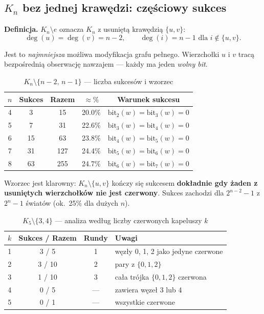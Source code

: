 \documentclass[12pt,a4paper]{article}
\theoremstyle{plain}
\theoremstyle{definition}
\theoremstyle{remark}
\begin{document}
\subsection{$K_n$ bez jednej krawędzi: częściowy sukces}
\label{sec:kne}

\textbf{Definicja.} $K_n \setminus e$ oznacza $K_n$ z usuniętą krawędzią $\{u, v\}$:
$$\deg(u) = \deg(v) = n-2, \qquad \deg(i) = n-1 \text{ dla } i \notin \{u, v\}.$$

Jest to \emph{najmniejsza} możliwa modyfikacja grafu pełnego. Wierzchołki $u$ i $v$ tracą bezpośrednią obserwację nawzajem — każdy ma jeden \emph{wolny bit}.

\begin{table}[H]
\centering
\caption{$K_n \setminus \{n{-}2,\, n{-}1\}$ — liczba sukcesów i wzorzec}
\begin{tabular}{ccccc}
\toprule
$n$ & Sukces & Razem & $\approx\%$ & Warunek sukcesu \\
\midrule
4 & 3  & 15  & 20.0\% & $\mathrm{bit}_{2}(w)=\mathrm{bit}_{3}(w)=0$ \\
5 & 7  & 31  & 22.6\% & $\mathrm{bit}_{3}(w)=\mathrm{bit}_{4}(w)=0$ \\
6 & 15 & 63  & 23.8\% & $\mathrm{bit}_{4}(w)=\mathrm{bit}_{5}(w)=0$ \\
7 & 31 & 127 & 24.4\% & $\mathrm{bit}_{5}(w)=\mathrm{bit}_{6}(w)=0$ \\
8 & 63 & 255 & 24.7\% & $\mathrm{bit}_{6}(w)=\mathrm{bit}_{7}(w)=0$ \\
\bottomrule
\end{tabular}
\end{table}

Wzorzec jest klarowny: $K_n \setminus \{u,v\}$ kończy się sukcesem \textbf{dokładnie gdy żaden z usuniętych wierzchołków nie jest czerwony}. Sukces zachodzi dla $2^{n-2} - 1$ z $2^n - 1$ światów (ok.\ 25\% dla dużych $n$).

\begin{table}[H]
\centering
\caption{$K_5 \setminus \{3,4\}$ — analiza według liczby czerwonych kapeluszy $k$}
\begin{tabular}{cccl}
\toprule
$k$ & Sukces / Razem & Rundy & Uwagi \\
\midrule
1 & 3 / 5  & 1 & węzły 0, 1, 2 jako jedyne czerwone \\
2 & 3 / 10 & 2 & pary z $\{0,1,2\}$ \\
3 & 1 / 10 & 3 & cała trójka $\{0,1,2\}$ czerwona \\
4 & 0 / 5  & — & zawiera węzeł 3 lub 4 \\
5 & 0 / 1  & — & wszystkie czerwone \\
\bottomrule
\end{tabular}
\end{table}
\end{document}

